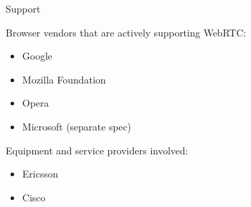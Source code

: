 \documentclass[first=red,second=purple,logo=yellowexc]{aaltoslides}
\begin{document}
\begin{frame}{Support}

Browser vendors that are actively supporting WebRTC:
\begin{itemize}
\item Google
\item Mozilla Foundation
\item Opera
\item Microsoft (separate spec)
\end{itemize}
Equipment and service providers involved:
\begin{itemize}
\item Ericsson
\item Cisco
\end{itemize}
\end{frame}

%
\end{document}
